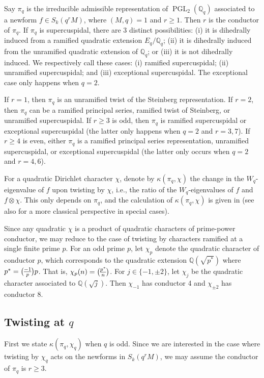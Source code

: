 \documentclass[11pt]{amsart}
\newcommand{\Q}{\mathbb Q}
\newcommand{\leg}{\overwithdelims ()}
\DeclareMathOperator{\PGL}{PGL}
\numberwithin{lem}{section}
\theoremstyle{remark}
\theoremstyle{definition}
\numberwithin{equation}{section}
\begin{document}
Say $\pi_q$ is the irreducible admissible representation of $\PGL_2(\Q_q)$ associated to a newform $f \in S_k(q^r M)$, where $(M,q) = 1$ and $r \ge 1$.  Then $r$ is the conductor of $\pi_q$.  If $\pi_q$ is supercuspidal, there are 3 distinct possibilities: (i) it is dihedrally induced from a ramified quadratic extension $E_q/\Q_q$; (ii)
it is dihedrally induced from the unramified quadratic extension of $\Q_q$;
or (iii) it is not dihedrally induced.  We respectively call these cases: (i) ramified supercuspidal; (ii) unramified supercuspidal; and (iii) exceptional supercuspidal.  The exceptional case only happens when $q=2$.

If $r=1$, then $\pi_q$ is an unramified twist of the Steinberg representation.  If $r=2$, then $\pi_q$ can be a ramified principal series, ramified twist of Steinberg, or unramified supercuspidal.  If $r \ge 3$ is odd, then $\pi_q$ is ramified supercuspidal or exceptional supercuspidal (the latter only happens when $q=2$ and $r=3, 7$). If $r \ge 4$ is even, either $\pi_q$ is a ramified principal series representation, unramified supercuspidal, or exceptional supercuspidal (the latter only occurs when $q=2$ and $r = 4, 6$).

For a quadratic Dirichlet character $\chi$, denote by $\kappa(\pi_q, \chi)$ the change in the $W_q$-eigenvalue of $f$ upon twisting by $\chi$, i.e., the ratio of the $W_q$-eigenvalues of $f$ and $f \otimes \chi$.  This only depends on $\pi_q$, and the calculation of $\kappa(\pi_q, \chi)$ is given in \cite{pacetti} (see also \cite{AL,atkin-li} for a more classical perspective in special cases).

Since any quadratic $\chi$ is a product of quadratic characters of prime-power conductor, we may reduce to the case of twisting by characters ramified at a single finite prime $p$.
For an odd prime $p$, let $\chi_p$ denote the quadratic character of conductor $p$, which corresponds to the quadratic extension $\Q(\sqrt{p^*})$ where $p^* = {-1 \leg p} p$.   That is, $\chi_p(n) = {p^* \leg n}$.  For $j \in \{ -1, \pm 2 \}$, let $\chi_j$ be the quadratic character associated to $\Q(\sqrt j)$.  Then $\chi_{-1}$ has conductor 4 and $\chi_{\pm 2}$ has conductor 8.  

\subsection{Twisting at $q$}
First we state $\kappa(\pi_q, \chi_q)$ when $q$ is odd.  Since we are interested in the case where twisting by $\chi_q$ acts on the newforms in $S_k(q^r M)$, we may assume the conductor of $\pi_q$ is $r \ge 3$.
\end{document}
